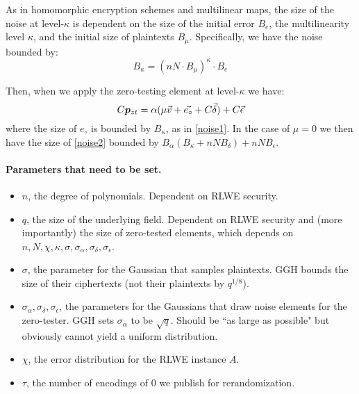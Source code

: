 As in homomorphic encryption schemes and multilinear maps, the size of the noise at level-$\kappa$ is dependent on the size of the initial error $B_e$, the multilinearity level $\kappa$, and the initial size of plaintexts $B_\mu$.  Specifically, we have the noise bounded by:
\begin{equation}
\label{noise1}
B_\kappa = (nN\cdot B_\mu)^\kappa \cdot B_e
\end{equation}

Then, when we apply the zero-testing element at level-$\kappa$ we have:
\begin{equation}
\label{noise2}
C\bm{p}_{zt} = \alpha (\mu \vec{v} + \vec{e_{\circ}} + C\vec{\delta}) + C\vec{\epsilon}
\end{equation}
where the size of $e_{\circ}$ is bounded by $B_\kappa$, as in \eqref{noise1}.  In the case of $\mu = 0$ we then have the size of \eqref{noise2} bounded by $B_\alpha(B_\kappa + nNB_\delta) + nNB_\epsilon$.

\paragraph{Parameters that need to be set.}

\begin{itemize}
\item $n$, the degree of polynomials.  Dependent on RLWE security.
\item $q$, the size of the underlying field.  Dependent on RLWE security and (more importantly) the size of zero-tested elements, which depends on $n, N, \chi, \kappa, \sigma, \sigma_\alpha, \sigma_\delta, \sigma_\epsilon$.
\item $\sigma$, the parameter for the Gaussian that samples plaintexts.  GGH bounds the size of their ciphertexts (not their plaintexts by $q^{1/8}$).
\item $\sigma_\alpha, \sigma_\delta, \sigma_\epsilon$, the parameters for the Gaussians that draw noise elements for the zero-tester.  GGH sets $\sigma_\alpha$ to be $\sqrt{q}$.  Should be ``as large as possible" but obviously cannot yield a uniform distribution.
\item $\chi$, the error distribution for the RLWE instance $A$.
\item $\tau$, the number of encodings of $0$ we publish for rerandomization.
\end{itemize}


